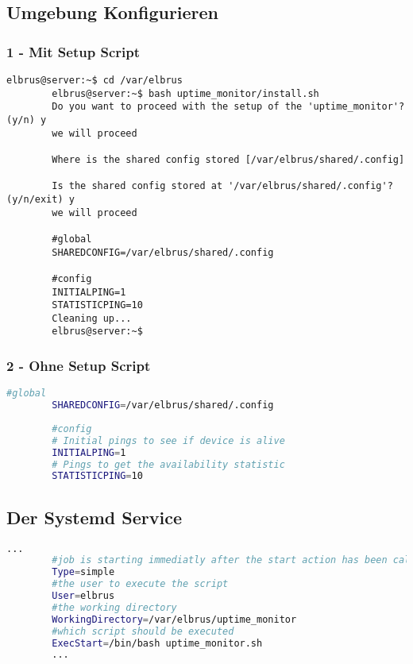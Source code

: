 	\subsection[file config]{Umgebung Konfigurieren}
	\subsubsection{1 - Mit Setup Script}
	
	\lstset{style=commands}
	\begin{lstlisting}[caption={Ausführen des 'install.sh' Scripts.}]
		elbrus@server:~$ cd /var/elbrus
		elbrus@server:~$ bash uptime_monitor/install.sh
		Do you want to proceed with the setup of the 'uptime_monitor'? (y/n) y
		we will proceed
		
		Where is the shared config stored [/var/elbrus/shared/.config]
		
		Is the shared config stored at '/var/elbrus/shared/.config'? (y/n/exit) y
		we will proceed
		
		#global
		SHAREDCONFIG=/var/elbrus/shared/.config
		
		#config
		INITIALPING=1
		STATISTICPING=10
		Cleaning up...
		elbrus@server:~$
	\end{lstlisting}
	
	\subsubsection{2 - Ohne Setup Script}
	
	\lstset{style=files}
	\begin{lstlisting}[caption={Anhand von '.env.example' eigene '.env' Datei anlegen.}, language=bash]
		#global
		SHAREDCONFIG=/var/elbrus/shared/.config
		
		#config
		# Initial pings to see if device is alive
		INITIALPING=1
		# Pings to get the availability statistic
		STATISTICPING=10
	\end{lstlisting}
	\newpage
	
	\subsection[systemd service]{Der Systemd Service}
	
	\lstset{style=files}
	\begin{lstlisting}[caption={uptime\_monitor.service.example - Die Variable 'WorkingDirectory' sowie die Variable 'User' anpassen.},language=bash ,keywords={WorkingDirectory, User}, keywordstyle=\color{red}, firstnumber=5]
		...
		#job is starting immediatly after the start action has been called
		Type=simple
		#the user to execute the script
		User=elbrus
		#the working directory
		WorkingDirectory=/var/elbrus/uptime_monitor
		#which script should be executed
		ExecStart=/bin/bash uptime_monitor.sh
		...
	\end{lstlisting}
	
